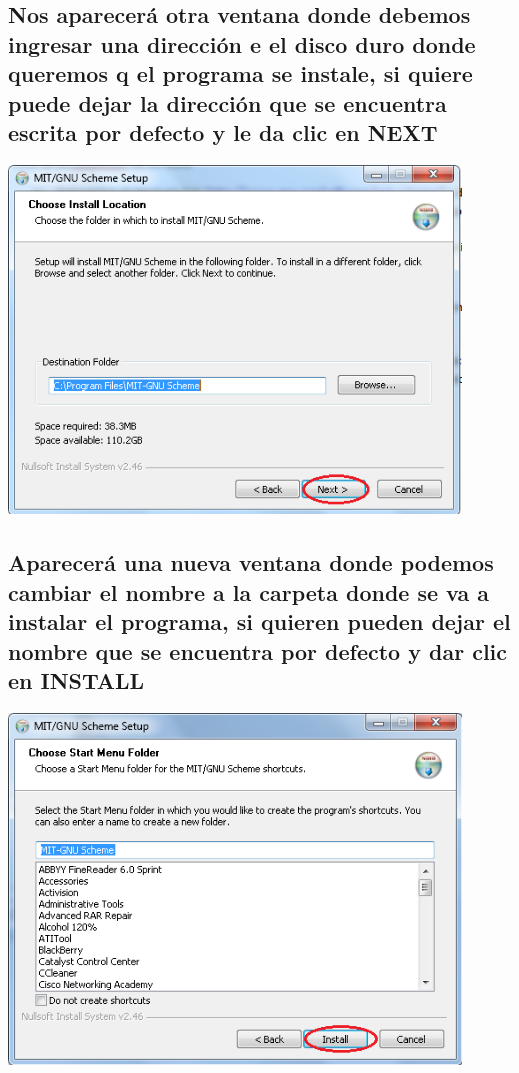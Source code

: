 \documentclass[11pt]{article} %
\begin{document}
\subsection{Nos aparecerá otra ventana donde debemos ingresar una dirección e el disco duro donde queremos q el programa se instale, si quiere puede dejar la dirección que se encuentra escrita por defecto y le da clic en NEXT}
\begin{center}
\includegraphics[width=12cm]{4.png}
\end{center}

\subsection{Aparecerá una nueva ventana donde podemos cambiar el nombre a la carpeta donde se va a instalar el programa, si quieren pueden dejar el nombre que se encuentra por defecto y dar clic en  INSTALL }
\begin{center}
\includegraphics[width=12cm]{5.png}
\end{center}
\end{document}
